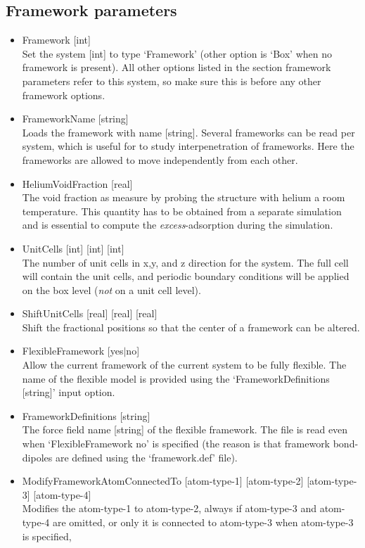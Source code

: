 \subsection*{Framework parameters}
\begin{itemize}
\item{Framework [int]}\\
Set the system [int] to type `Framework' (other option is `Box' when no framework is present).
All other options listed in the section framework parameters refer to this system, so make sure this is before any other framework options.
\item{FrameworkName [string]}\\
Loads the framework with name [string]. Several frameworks can be read per system, 
which is useful for to study interpenetration of frameworks. Here the frameworks
are allowed to move independently from each other.
\item{HeliumVoidFraction [real]}\\
The void fraction as measure by probing the structure with helium a room temperature. This quantity has to be obtained from a separate
simulation and is essential to compute the \emph{excess}-adsorption during the simulation.
\item{UnitCells [int] [int] [int]}\\
The number of unit cells in x,y, and z direction for the system. The full cell will contain the unit cells, and periodic boundary conditions
will be applied on the box level (\emph{not} on a unit cell level).
\item{ShiftUnitCells [real] [real] [real]}\\
Shift the fractional positions so that the center of a framework can be altered.
\item{FlexibleFramework [yes$|$no]}\\
Allow the current framework of the current system to be fully flexible. The name of the flexible model is provided using the
`FrameworkDefinitions [string]' input option.
\item{FrameworkDefinitions [string]}\\
The force field name [string] of the flexible framework. The file is read even when `FlexibleFramework no' is specified (the reason is that 
framework bond-dipoles are defined using the `framework.def' file).
\item{ModifyFrameworkAtomConnectedTo [atom-type-1] [atom-type-2] [atom-type-3] [atom-type-4]}\\
Modifies the atom-type-1 to atom-type-2, always if atom-type-3 and atom-type-4 are omitted, or only it is connected to atom-type-3 when atom-type-3 is specified,

\end{itemize}
